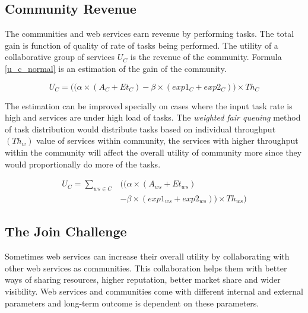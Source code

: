 \documentclass[10pt,journal,cspaper,compsoc]{IEEEtran}
\begin{document}
\subsection{Community Revenue}

The communities and web services earn revenue by performing tasks. The total gain is function of quality of rate of tasks being performed. The utility of a collaborative group of services $U_{C}$ is the revenue of the community. Formula \ref{u_c_normal} is an estimation of the gain of the community.

\begin{equation}\label{u_c_normal}
U_{C} = \big((\alpha \times (A_{C} + Et_{C}) - \beta \times (exp1_{C} + exp2_{C})\big) \times Th_{C}
\end{equation}

The estimation can be improved specially on cases where the input task rate is high and services are under high load of tasks. The \emph{weighted fair queuing} method of task distribution would distribute tasks based on individual throughput $(Th_{w})$ value of services within community, the services with higher throughput within the community will affect the overall utility of community more since they would proportionally do more of the tasks.

\begin{equation}\label{u_c_load}
\begin{split}
U_{C} = \sum_{ws \in C}&\bigg(\big(\alpha \times (A_{ws} + Et_{ws}) \\
        & - \beta \times (exp1_{ws} + exp2_{ws})\big) \times Th_{ws}\bigg)
\end{split}
\end{equation}

\subsection{The Join Challenge}\label{s:tjc}
Sometimes web services can increase their overall utility by collaborating with other web services as communities. This collaboration helps them with better ways of sharing resources, higher reputation, better market share and wider visibility. Web services and communities come with different internal and external parameters and long-term outcome is dependent on these parameters. 
\end{document}
